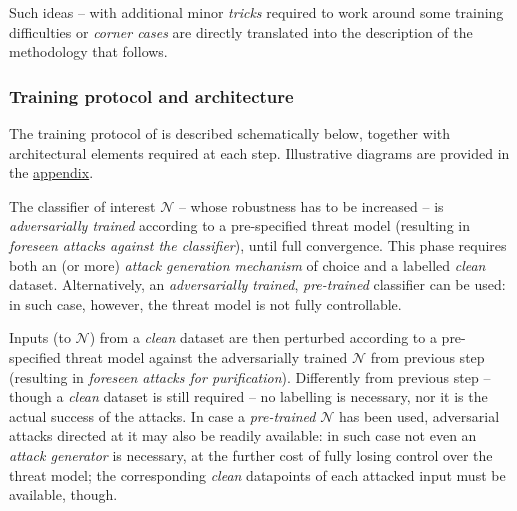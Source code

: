 Such ideas -- with additional minor \textit{tricks} required to work around some training difficulties or \textit{corner cases} are directly translated into the description of the methodology that follows.

\subsubsection{Training protocol and architecture}
The training protocol of \carso is described schematically below, together with architectural elements required at each step. Illustrative diagrams are provided in the \hyperref[sec:appendix]{appendix}.

The classifier of interest $\mathcal{N}$ -- whose robustness has to be increased -- is \textit{adversarially trained} according to a pre-specified threat model (resulting in \textit{foreseen attacks against the classifier}), until full convergence. This phase requires both an (or more) \textit{attack generation mechanism} of choice and a labelled \textit{clean} dataset. Alternatively, an \textit{adversarially trained}, \textit{pre-trained} classifier can be used: in such case, however, the threat model is not fully controllable.

Inputs (to $\mathcal{N}$) from a \textit{clean} dataset are then perturbed according to a pre-specified threat model against the adversarially trained $\mathcal{N}$ from previous step (resulting in \textit{foreseen attacks for purification}). Differently from previous step -- though a \textit{clean} dataset is still required -- no labelling is necessary, nor it is the actual success of the attacks. In case a \textit{pre-trained} $\mathcal{N}$ has been used, adversarial attacks directed at it may also be readily available: in such case not even an \textit{attack generator} is necessary, at the further cost of fully losing control over the threat model; the corresponding \textit{clean} datapoints of each attacked input must be available, though.

